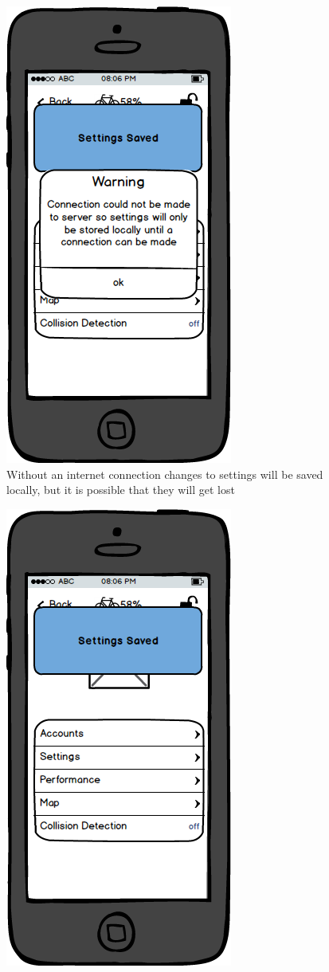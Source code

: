 \documentclass[a4paper]{report}
\begin{document}
{\begin{figure}
\includegraphics[scale=0.9]{figures/prototype_2/settings_connection_warn}
\caption{Without an internet connection changes to settings will be saved locally, but it is possible that they will get lost}
\end{figure}
\clearpage
\begin{figure}
\centering
\includegraphics[scale=0.9]{figures/prototype_2/settings_saved}

\end{figure}}
\end{document}
